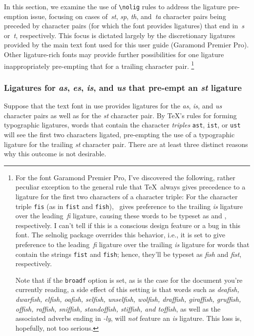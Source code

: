 \documentclass[11pt]{article}
\newcommand{\pkg}[1]{\textsf{#1}}
\newcommand{\opt}[1]{\texttt{#1}}
\newcommand{\cmmd}[1]{\texttt{\textbackslash #1}}
\begin{document}
In this section, we examine the use of \cmmd{nolig} rules to address the ligature pre-emption issue, focusing on cases of~\emph{st}, \emph{sp}, \emph{th}, and~\emph{ta} character pairs being preceded by character pairs (for which the font provides ligatures) that end in~\emph{s} or~\emph{t}, respectively. This focus is dictated largely by the discretionary ligatures provided by the main text font used for this user guide (Garamond Premier Pro). Other ligature-rich fonts may provide further possibilities for one ligature inappropriately pre-empting that for a trailing character pair.%
\footnote{For the font Garamond Premier Pro, I've discovered the following, rather peculiar exception to the general rule that \TeX\ always gives precedence to a ligature for the first two characters of a character triple: For the character triple \opt{fis} (as in \opt{fist} and \opt{fish}), \LuaTeX\ gives preference to the trailing \emph{is} ligature over the leading\, \emph{fi} ligature, causing these words to be typeset as \emph{} and \emph{}, respectively. I can't tell if this is a conscious design feature or a bug in this font. The \pkg{selnolig} package overrides this behavior, i.e., it is set to give preference to the leading\, \emph{fi} ligature over the trailing \emph{is} ligature for words that contain the strings \opt{fist} and \opt{fish}; hence, they'll be typeset as \emph{fish} and \emph{fist}, respectively. 

Note that if the \opt{broadf} option is set, as is the case for the document you're currently reading, a side effect of this setting is that words such as \emph{deafish, dwarfish, elfish, oafish, selfish, unselfish, wolfish, draffish, giraffish, gruffish, offish, raffish, sniffish, standoffish, stiffish, \emph{and} toffish}, as well as the associated adverbs ending in \emph{-ly}, will \emph{not} feature an \emph{is} ligature. This loss is, hopefully, not too serious.}

\subsubsection*{Ligatures for \emph{as}, \emph{\ebg es},  \emph{is}, and \emph{us} that pre-empt an \emph{st} ligature}

Suppose that the text font in use provides ligatures for the \emph{as}, \emph{is}, and \emph{us} character pairs as well as for the \emph{st} character pair. By \TeX's rules for forming typographic ligatures, words that contain the character \emph{triples} \opt{ast}, \opt{ist}, or \opt{ust} will see the first two characters ligated, pre-empting the use of a typographic ligature for the trailing \emph{st} character pair. There are at least three distinct reasons why this outcome is not desirable.
\end{document}
